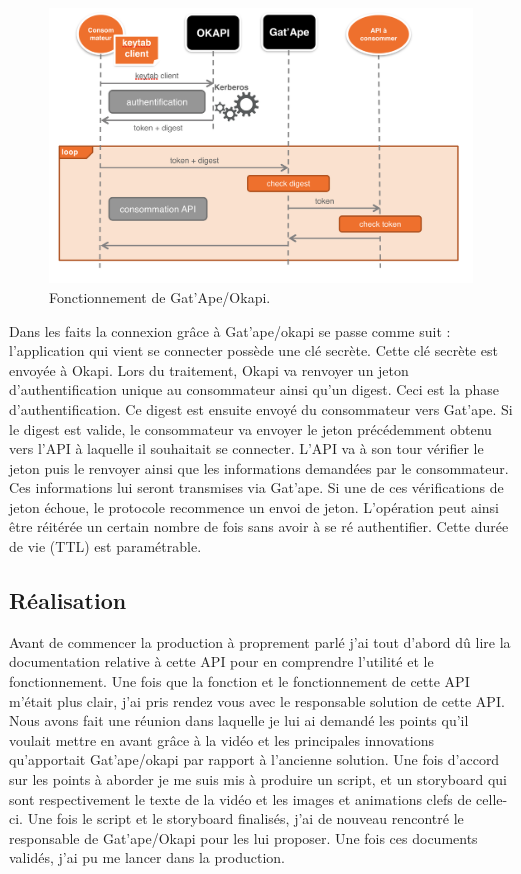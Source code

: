 \begin{figure}[htp]
  \centering
  \includegraphics[width=15cm]{images/gao/gao1}
  \caption{Fonctionnement de Gat'Ape/Okapi.}
  \label{gatape}
\end{figure}


Dans les faits la connexion grâce à Gat'ape/okapi se passe comme suit : 
l'application qui vient se connecter possède une clé secrète. Cette clé secrète est envoyée à Okapi. Lors du traitement, Okapi va renvoyer un jeton d'authentification unique au consommateur ainsi qu'un digest. Ceci est la phase d'authentification.  Ce digest est ensuite envoyé du consommateur vers Gat'ape. Si le digest est valide, le consommateur va envoyer le jeton précédemment obtenu vers l'API à laquelle il souhaitait se connecter. L'API va à son tour vérifier le jeton puis le renvoyer ainsi que les informations demandées par le consommateur. Ces informations lui seront transmises via Gat'ape. Si une de ces vérifications de jeton échoue, le protocole recommence un envoi de jeton. L'opération peut ainsi être réitérée un certain nombre de fois sans avoir à se ré authentifier. Cette durée de vie (TTL) est paramétrable.




\subsection{Réalisation}
Avant de commencer la production à proprement parlé j'ai tout d'abord dû lire la documentation relative à cette API pour en comprendre l'utilité et le fonctionnement. Une fois que la fonction et le fonctionnement de cette API m'était plus clair, j'ai pris rendez vous avec le responsable solution de cette API. Nous avons fait une réunion dans laquelle je lui ai demandé les points qu'il voulait mettre en avant grâce à la vidéo et les principales innovations qu'apportait Gat'ape/okapi par rapport à l'ancienne solution. Une fois d'accord sur les points à aborder je me suis mis à produire un script, et un storyboard qui sont respectivement le texte de la vidéo et les images et animations clefs de celle-ci. Une fois le script et le storyboard finalisés, j'ai de nouveau rencontré le responsable de Gat'ape/Okapi pour les lui proposer. Une fois ces documents validés, j'ai pu me lancer dans la production. \\

